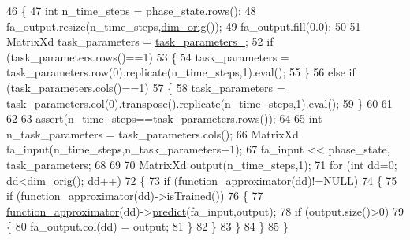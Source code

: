 \begin{DoxyCode}
46     \{
47         \textcolor{keywordtype}{int} n\_time\_steps = phase\_state.rows(); 
48         fa\_output.resize(n\_time\_steps,\hyperlink{group__DynamicalSystems_ga93d7cbbf2e471b00f124e41706405a05}{dim\_orig}());
49         fa\_output.fill(0.0);
50 
51         MatrixXd task\_parameters = \hyperlink{classDmpBbo_1_1DmpContextual_af0d2e6fef248e131b92fc244b55b50c6}{task\_parameters\_};
52         \textcolor{keywordflow}{if} (task\_parameters.rows()==1)
53         \{ 
54             task\_parameters = task\_parameters.row(0).replicate(n\_time\_steps,1).eval();
55         \}
56         \textcolor{keywordflow}{else} \textcolor{keywordflow}{if} (task\_parameters.cols()==1)
57         \{
58             task\_parameters = task\_parameters.col(0).transpose().replicate(n\_time\_steps,1).eval();
59         \}
60 
61 
62 
63         assert(n\_time\_steps==task\_parameters.rows());
64 
65         \textcolor{keywordtype}{int} n\_task\_parameters = task\_parameters.cols();
66         MatrixXd fa\_input(n\_time\_steps,n\_task\_parameters+1);
67         fa\_input << phase\_state, task\_parameters;
68 
69 
70         MatrixXd output(n\_time\_steps,1);
71         \textcolor{keywordflow}{for} (\textcolor{keywordtype}{int} dd=0; dd<\hyperlink{group__DynamicalSystems_ga93d7cbbf2e471b00f124e41706405a05}{dim\_orig}(); dd++)
72         \{
73             \textcolor{keywordflow}{if} (\hyperlink{classDmpBbo_1_1Dmp_ac428e2dd848c99ddaf517f2dbacdf3ad}{function\_approximator}(dd)!=NULL)
74             \{
75                 \textcolor{keywordflow}{if} (\hyperlink{classDmpBbo_1_1Dmp_ac428e2dd848c99ddaf517f2dbacdf3ad}{function\_approximator}(dd)->\hyperlink{classDmpBbo_1_1FunctionApproximator_a178135f623d9b9058870851a53299c6e}{isTrained}()) 
76                 \{
77                     \hyperlink{classDmpBbo_1_1Dmp_ac428e2dd848c99ddaf517f2dbacdf3ad}{function\_approximator}(dd)->\hyperlink{classDmpBbo_1_1FunctionApproximator_a0547681a81d4c43ce2601f16047baf7a}{predict}(fa\_input,output);
78                     \textcolor{keywordflow}{if} (output.size()>0)
79                     \{
80                         fa\_output.col(dd) = output;
81                     \}
82                 \}
83             \}
84         \}
85     \}
\end{DoxyCode}


